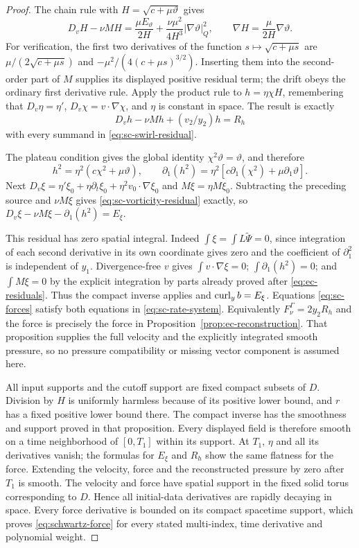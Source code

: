 \begin{proof}
The chain rule with $H=\sqrt{c+\mu\vartheta}$ gives
\[
 D_vH-\nu MH
 =\frac{\mu E_\vartheta}{2H}
   +\frac{\nu\mu^2}{4H^3}|\nabla\vartheta|_Q^2,
 \qquad \nabla H=\frac\mu{2H}\nabla\vartheta.
\]
For verification, the first two derivatives of the function
$s\mapsto\sqrt{c+\mu s}$ are $\mu/(2\sqrt{c+\mu s})$
and $-\mu^2/(4(c+\mu s)^{3/2})$. Inserting them into the
second-order part of $M$ supplies its displayed positive residual
term; the drift obeys the ordinary first derivative rule.
Apply the product rule to $h=\eta\chi H$, remembering that
$D_v\eta=\eta'$, $D_v\chi=v\cdot\nabla\chi$, and $\eta$
is constant in space. The result is exactly
\[
 D_vh-\nu Mh+(v_2/y_2)h=R_h
\]
with every summand in \eqref{eq:sc-swirl-residual}.

The plateau condition gives the global identity
$\chi^2\vartheta=\vartheta$, and therefore
\[
 h^2=\eta^2(c\chi^2+\mu\vartheta),\qquad
 \partial_1(h^2)=\eta^2
                    [c\partial_1(\chi^2)+\mu\partial_1\vartheta].
\]
Next $D_v\xi=\eta'\xi_0+\eta\partial_t\xi_0
+\eta^2v_0\cdot\nabla\xi_0$ and $M\xi=\eta M\xi_0$.
Subtracting the preceding source and $\nu M\xi$ gives
\eqref{eq:sc-vorticity-residual} exactly, so
$D_v\xi-\nu M\xi-\partial_1(h^2)=E_\xi$.

This residual has zero spatial integral. Indeed
$\int\xi=\int L\widetilde\Psi=0$, since integration of each
second derivative in its own coordinate gives zero and the coefficient
of $\partial_1^2$ is independent of $y_1$.
Divergence-free $v$ gives $\int v\cdot\nabla\xi=0$;
$\int\partial_1(h^2)=0$; and
$\int M\xi=0$ by the explicit integration by parts already proved
after \eqref{eq:ec-residuals}. Thus the compact inverse applies and
$\operatorname{curl}_y b=E_\xi$. Equations \eqref{eq:sc-forces} satisfy both
equations in \eqref{eq:sc-rate-system}. Equivalently
$F_\nu^\Gamma=2y_2R_h$ and the force is precisely the force in
Proposition~\ref{prop:ec-reconstruction}. That proposition supplies
the full velocity and the explicitly integrated smooth pressure, so
no pressure compatibility or missing vector component is assumed here.

All input supports and the cutoff support are fixed compact subsets
of $D$. Division by $H$ is uniformly harmless because of its positive
lower bound, and $r$ has a fixed positive lower bound there. The
compact inverse has the smoothness and support proved in that
proposition. Every displayed field is therefore smooth on a time
neighborhood of $[0,T_1]$ within its support. At $T_1$, $\eta$ and
all its derivatives vanish; the formulas for $E_\xi$ and $R_h$
show the same flatness for the force. Extending the velocity, force
and the reconstructed pressure by zero after $T_1$ is smooth.
The velocity and force have spatial support in the fixed solid torus
corresponding to $D$. Hence all initial-data derivatives are rapidly decaying in
space. Every force derivative is bounded on its compact spacetime
support, which proves \eqref{eq:schwartz-force} for every stated
multi-index, time derivative and polynomial weight.


\end{proof}
